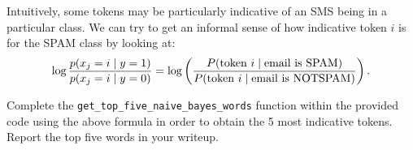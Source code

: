 \item {}
Intuitively, some tokens may be particularly indicative of an SMS being
in a particular class.  We can try to get an informal sense of how indicative
token $i$ is for the SPAM class by looking at:
\begin{equation*}
  \log \frac{p(x_j = i \mid y=1)}{p(x_j = i \mid y=0)}
  = \log\left(\frac{P(\hbox{token $i$} \mid \hbox{email is SPAM})}
    {P(\hbox{token $i$} \mid \hbox{email is NOTSPAM})}\right).
\end{equation*}

Complete the \texttt{get\_top\_five\_naive\_bayes\_words} function within the provided code using the above formula in order to obtain the 5 most indicative tokens.
Report the top five words in your writeup.

